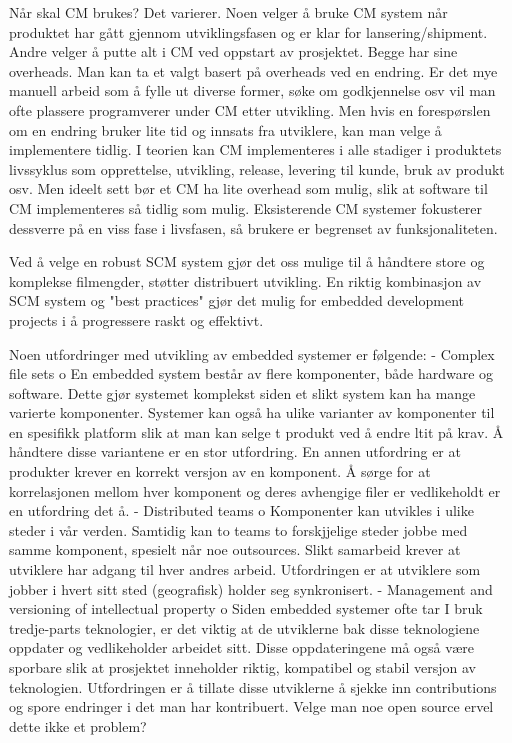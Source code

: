 Når skal CM brukes? Det varierer. Noen velger å bruke CM system når produktet har gått gjennom utviklingsfasen og er klar for lansering/shipment. Andre velger å putte alt i CM ved oppstart av prosjektet. Begge har sine overheads. Man kan ta et valgt basert på overheads ved en endring. Er det mye manuell arbeid som å fylle ut diverse former, søke om godkjennelse osv vil man ofte plassere programverer under CM etter utvikling. Men hvis en forespørslen om en endring bruker lite tid og innsats fra utviklere, kan man velge å implementere tidlig. I teorien kan CM implementeres i alle stadiger i produktets livssyklus som opprettelse, utvikling, release, levering til kunde, bruk av produkt osv. Men ideelt sett bør et CM ha lite overhead som mulig, slik at software til CM implementeres så tidlig som mulig. Eksisterende CM systemer fokusterer dessverre på en viss fase i livsfasen, så brukere er begrenset av funksjonaliteten.



Ved å velge en robust SCM system gjør det oss mulige til å håndtere store og komplekse filmengder, støtter distribuert utvikling. En riktig kombinasjon av SCM system og "best practices" gjør det mulig for embedded development projects i å progressere raskt og effektivt.


Noen utfordringer med utvikling av embedded systemer er følgende:
-	Complex file sets
o	En embedded system består av flere komponenter, både hardware og software. Dette gjør systemet komplekst siden et slikt system kan ha mange varierte komponenter. Systemer kan også ha ulike varianter av komponenter til en spesifikk platform slik at man kan selge t produkt ved å endre ltit på krav. Å håndtere disse variantene er en stor utfordring. En annen utfordring er at produkter krever en korrekt versjon av en komponent. Å sørge for at korrelasjonen mellom hver komponent og deres avhengige filer er vedlikeholdt er en utfordring det å.
-	Distributed teams
o	Komponenter kan utvikles i ulike steder i vår verden. Samtidig kan to teams to forskjjelige steder jobbe med samme komponent, spesielt når noe outsources. Slikt samarbeid krever at utviklere har adgang til hver andres arbeid. Utfordringen er at utviklere som jobber i hvert sitt sted (geografisk) holder seg synkronisert.
-	Management and versioning of intellectual property
o	Siden embedded systemer ofte tar I bruk tredje-parts teknologier, er det viktig at de utviklerne bak disse teknologiene oppdater og vedlikeholder arbeidet sitt. Disse oppdateringene må også være sporbare slik at prosjektet inneholder riktig, kompatibel og stabil versjon av teknologien. Utfordringen er å tillate disse utviklerne å sjekke inn contributions og spore endringer i det man har kontribuert. Velge man noe open source ervel dette ikke et problem?





